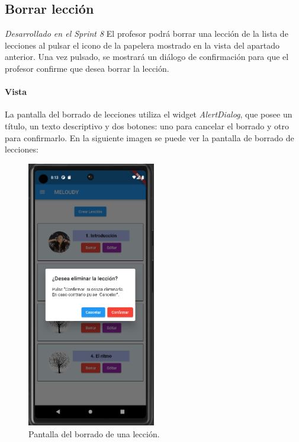 \newpage

\subsection{Borrar lección} 

\textit{Desarrollado en el Sprint 8}
El profesor podrá borrar una lección de la lista de lecciones al pulsar el icono de la papelera mostrado en la vista del apartado anterior. 
Una vez pulsado, se mostrará un diálogo de confirmación para que el profesor confirme que desea borrar la lección.

\paragraph*{Vista}
La pantalla del borrado de lecciones utiliza el widget \textit{AlertDialog}, que posee
un título, un texto descriptivo y dos botones: uno para cancelar el borrado y otro para confirmarlo.
En la siguiente imagen se puede ver la pantalla de borrado de lecciones:


\begin{figure}[H]
  \centering
  \includegraphics[width=0.5\textwidth]{imagenes/c7/borrarleccion.png}
  \caption{Pantalla del borrado de una lección.} 
  \label{fig:borradoleccion}
\end{figure}

